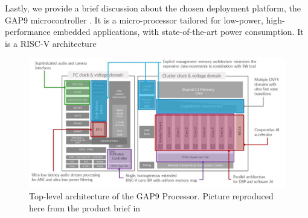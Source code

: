 Lastly, we provide a brief discussion about the chosen deployment platform, the GAP9 microcontroller \cite{GWGAP9}. 
It is a micro-processor tailored for low-power, high-performance embedded applications, with state-of-the-art power consumption. It is a RISC-V architecture

\begin{figure}[h!]
    \centering
    \includegraphics[width=\textwidth]{fig/gap9_toplevel.png}
    \caption{Top-level architecture of the GAP9 Processor. Picture reproduced here from the product brief in \cite{GWGAP9}}
    \label{fig:gap9_toplevel}
\end{figure}